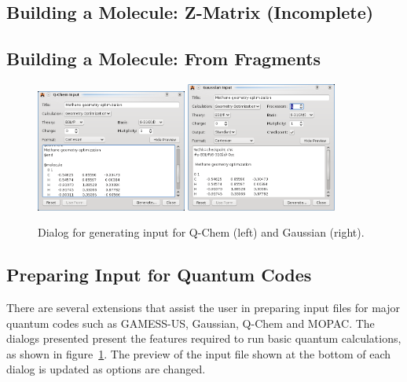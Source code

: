 \documentclass{article}
\begin{document}
\subsection{Building a Molecule: Z-Matrix (Incomplete)}

\subsection{Building a Molecule: From Fragments}

\begin{figure}
	\includegraphics[width=0.44\textwidth]{images/avogadro-q-chem}
	\hspace{0.1cm}
	\includegraphics[width=0.44\textwidth]{images/avogadro-gaussian}
	\caption{Dialog for generating input for Q-Chem (left) and Gaussian (right).}
	\label{f:quantumdialogs}
\end{figure}

\subsection{Preparing Input for Quantum Codes}

There are several extensions that assist the user in preparing input files for major quantum codes such as GAMESS-US, Gaussian, Q-Chem and MOPAC. The dialogs presented present the features required to run basic quantum calculations, as shown in figure~\ref{f:quantumdialogs}. The preview of the input file shown at the bottom of each dialog is updated as options are changed.
\end{document}
